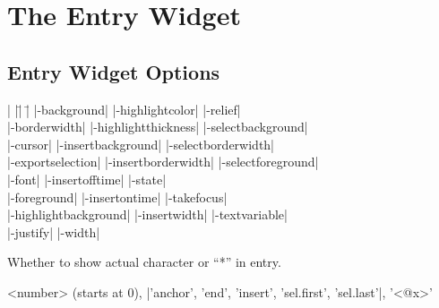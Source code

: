 
\section{The Entry Widget}

\subsection*{Entry Widget Options}
\begin{tabbing}
|                    |\=|                     |\= \kill
|-background|       \> |-highlightcolor|     \> |-relief| \\
|-borderwidth|      \> |-highlightthickness| \> |-selectbackground| \\             
|-cursor|	    \> |-insertbackground|   \> |-selectborderwidth| \\   
|-exportselection|  \> |-insertborderwidth|  \> |-selectforeground| \\  
|-font|             \> |-insertofftime|      \> |-state| \\   
|-foreground|       \> |-insertontime|       \> |-takefocus| \\       
|-highlightbackground| \> |-insertwidth|     \> |-textvariable| \\              
 \> |-justify| \> |-width| \\
\end{tabbing}

\vskip5pt
\begin{enum}{1cm}

Whether to show actual character or ``*'' in entry.

\end{enum}
\begin{enum}{2.5cm}

<number> (starts at 0), |'anchor', 'end', 'insert', 'sel.first', 'sel.last'|, '<@x>'

\end{enum}

